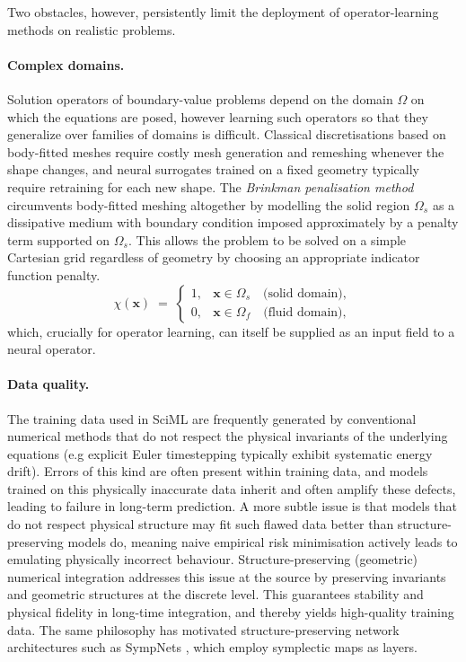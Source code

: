 \documentclass[11pt]{article}
\theoremstyle{definition}
\theoremstyle{remark}
\newcommand{\bx}{\bm{x}}
\newcommand{\chixx}{\chi(\bx)}
\begin{document}
Two obstacles, however, persistently limit the deployment of
operator-learning methods on realistic problems.

\paragraph{Complex domains.}
Solution operators of boundary-value problems depend on the domain
$\Omega$ on which the equations are posed, however learning such operators so that they generalize over families of domains is difficult. Classical discretisations based on body-fitted meshes require costly mesh generation and remeshing whenever the shape changes, and neural surrogates trained on a fixed geometry typically require retraining for each new shape.  The \emph{Brinkman penalisation method} \cite{angot1999penalisation,kolomenskiy2009fourier} circumvents
body-fitted meshing altogether by modelling the solid region $\Omega_s$
as a dissipative medium with boundary condition imposed
approximately by a penalty term supported on $\Omega_s$. This allows the
problem to be solved on a simple Cartesian grid regardless of geometry by choosing an appropriate indicator function penalty. 
\begin{equation}
\label{eq:indicator}
\chixx \;=\;
\begin{cases}
1, & \bx\in\Omega_s \quad\text{(solid domain)},\\[2pt]
0, & \bx\in\Omega_f \quad\text{(fluid domain)},
\end{cases}
\end{equation}
which, crucially for operator learning, can itself be supplied as an
input field to a neural operator.

\paragraph{Data quality.}
The training data used in SciML are frequently generated by
conventional numerical methods that do not respect the physical
invariants of the underlying equations (e.g explicit Euler timestepping typically exhibit systematic energy drift).
Errors of this kind are often present within training data, and models
trained on this physically inaccurate data inherit and often amplify these defects, leading to failure in long-term prediction.  A more subtle issue is that models that do not respect physical structure may fit such flawed data better than structure-preserving models do, meaning naive empirical risk minimisation actively leads to emulating physically incorrect behaviour.
Structure-preserving (geometric) numerical integration
\cite{hairer2006geometric} addresses this issue at the source by
preserving invariants and geometric structures at the discrete level.
This guarantees stability and physical fidelity in long-time
integration, and thereby yields high-quality training data.  The same
philosophy has motivated structure-preserving network architectures
such as SympNets \cite{jin2020sympnets}, which employ symplectic maps
as layers.
\end{document}
